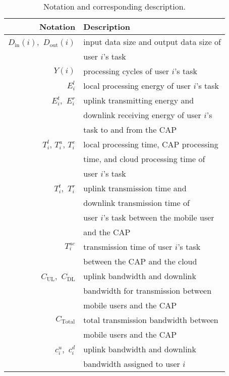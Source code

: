 \documentclass[10pt,journal,compsoc]{IEEEtran}
\begin{document}
\begin{table}[t]
\caption{Notation and corresponding description.} \centering
\normalsize
\begin{tabular}{|r| l|}
\hline %
\textbf{Notation}& \textbf{Description} \\
\hline %
$D_{{\textrm{in}}}(i)$,\ $D_{{\textrm{out}}}(i)$ & input data size and output data size of \\
         & user $i$'s task\\
$Y(i)$ & processing cycles of user $i$'s task\\
$E^l_{i}$ & local processing energy of user $i$'s task\\
$E^t_{i}$,\ $E^r_{i}$ & uplink transmitting energy and \\
         &  downlink  receiving energy of user $i$'s  \\
         & task to and from the CAP\\
$T^l_{i}$, $T^a_{i}$, $T^c_{i}$ & local processing time, CAP processing\\
         & time, and cloud processing time of \\
         & user $i$'s  task\\
$T^t_{i}$,\ $T^r_{i}$ & uplink transmission time and \\
         &  downlink transmission time of \\
         &  user $i$'s task between the mobile user \\
         & and the CAP\\
$T^{ac}_{i}$ & transmission time of user $i$'s task \\
         &  between the CAP and the cloud\\
$C_{\textrm{UL}}$,\ $C_{\textrm{DL}}$ & uplink bandwidth and downlink \\
         &  bandwidth for transmission between \\
         &  mobile users and the CAP\\
$C_{\textrm{Total}}$ & total transmission bandwidth between \\
         &  mobile users and the CAP\\
$c^u_{i}$,\ $c^d_{i}$ & uplink bandwidth and downlink\\
         &  bandwidth assigned to user $i$\\

\end{tabular}
\end{table}
\end{document}
